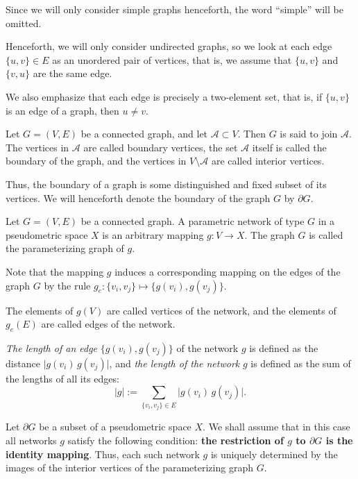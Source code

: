 \documentclass{svproc}
\begin{document}
Since we will only consider simple graphs henceforth, the word ``simple'' will be omitted.

Henceforth, we will only consider undirected graphs, so we look at each edge $\{u, v\}\in E$ as an unordered pair of vertices, that is, we assume that $\{u, v\}$ and $\{v, u\}$ are the same edge.

We also emphasize that each edge is precisely a two-element set, that is, if $\{u, v\}$ is an edge of a graph, then $u\neq v.$

\begin{definition}
Let $G = (V, E)$ be a connected graph, and let $\mathcal{A} \subset V$. Then $G$ is said to join $\mathcal{A}$. The vertices in $\mathcal{A}$ are called boundary vertices, the set $\mathcal{A}$ itself is called the boundary of the graph, and the vertices in $V \setminus \mathcal{A}$ are called interior vertices.
\end{definition}

Thus, the boundary of a graph is some distinguished and fixed subset of its vertices. We will henceforth denote the boundary of the graph $G$ by $\partial G$.

\begin{definition} 
Let $G = (V, E)$ be a connected graph. A parametric network of type $G$ in a pseudometric space $X$ is an arbitrary mapping $g\colon V\rightarrow X$. The graph $G$ is called the parameterizing graph of $g$.
\end{definition}

Note that the mapping $g$ induces a corresponding mapping on the edges of the graph $G$ by the rule $g_e\colon \{v_i, v_j\} \mapsto \bigl\{g(v_i), g(v_j)\bigr\}$.

\begin{definition}
The elements of $g(V)$ are called vertices of the network, and the elements of $g_e(E)$ are called edges of the network.
\end{definition}

\textit{The length of an edge} $\bigl\{g(v_i), g(v_j)\bigr\}$ of the network $g$ is defined as the distance $\bigl|g(v_i)\, g(v_j)\bigr|$, and \textit{the length of the network} $g$ is defined as the sum of the lengths of all its edges:
$$|g| := \sum\limits_{\{v_i, v_j\}\in E} \bigl|g(v_i)\, g(v_j)\bigr|.$$

Let $\partial G$ be a subset of a pseudometric space $X$. We shall assume that in this case all networks $g$ satisfy the following condition: \textbf{the restriction of {\boldmath $g$} to {\boldmath $\partial G$} is the identity mapping}. Thus, each such network $g$ is uniquely determined by the images of the interior vertices of the parameterizing graph $G$.
\end{document}
